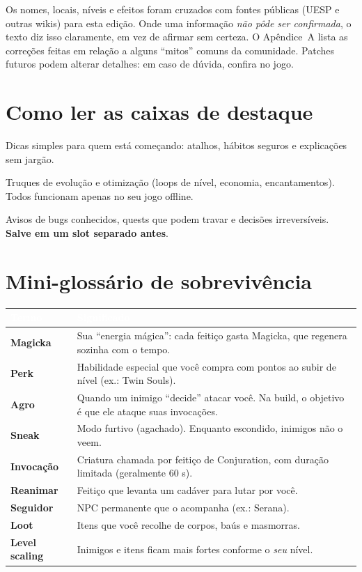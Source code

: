 \documentclass[11pt,a4paper,oneside,openany]{book}
\newcommand{\cabec}[1]{\textcolor{white}{\sffamily\bfseries\small #1}}
\newcommand{\tabhead}{\rowcolor{NecroEmerald}}
\renewcommand{\arraystretch}{1.25}
\begin{document}
\begin{nota}
Os nomes, locais, níveis e efeitos foram cruzados com fontes públicas (UESP e outras wikis) para esta edição. Onde uma informação \emph{não pôde ser confirmada}, o texto diz isso claramente, em vez de afirmar sem certeza. O Apêndice~A lista as correções feitas em relação a alguns ``mitos'' comuns da comunidade. Patches futuros podem alterar detalhes: em caso de dúvida, confira no jogo.
\end{nota}

\section{Como ler as caixas de destaque}
\begin{dica}
Dicas simples para quem está começando: atalhos, hábitos seguros e explicações sem jargão.
\end{dica}
\begin{exploit}
Truques de evolução e otimização (loops de nível, economia, encantamentos). Todos funcionam apenas no seu jogo offline.
\end{exploit}
\begin{alerta}
Avisos de bugs conhecidos, quests que podem travar e decisões irreversíveis. \textbf{Salve em um slot separado antes}.
\end{alerta}

\section{Mini-glossário de sobrevivência}
\begin{center}
\renewcommand{\arraystretch}{1.25}
\begin{tabularx}{\linewidth}{@{}L{3.3cm}Y@{}}
\tabhead \cabec{Termo} & \cabec{Significado} \\
\toprule
\textbf{Magicka} & Sua ``energia mágica'': cada feitiço gasta Magicka, que regenera sozinha com o tempo. \\
\textbf{Perk} & Habilidade especial que você compra com pontos ao subir de nível (ex.: Twin Souls). \\
\textbf{Agro} & Quando um inimigo ``decide'' atacar você. Na build, o objetivo é que ele ataque suas invocações. \\
\textbf{Sneak} & Modo furtivo (agachado). Enquanto escondido, inimigos não o veem. \\
\textbf{Invocação} & Criatura chamada por feitiço de Conjuration, com duração limitada (geralmente 60 s). \\
\textbf{Reanimar} & Feitiço que levanta um cadáver para lutar por você. \\
\textbf{Seguidor} & NPC permanente que o acompanha (ex.: Serana). \\
\textbf{Loot} & Itens que você recolhe de corpos, baús e masmorras. \\
\textbf{Level scaling} & Inimigos e itens ficam mais fortes conforme o \emph{seu} nível. \\
\bottomrule
\end{tabularx}
\end{center}
\end{document}
